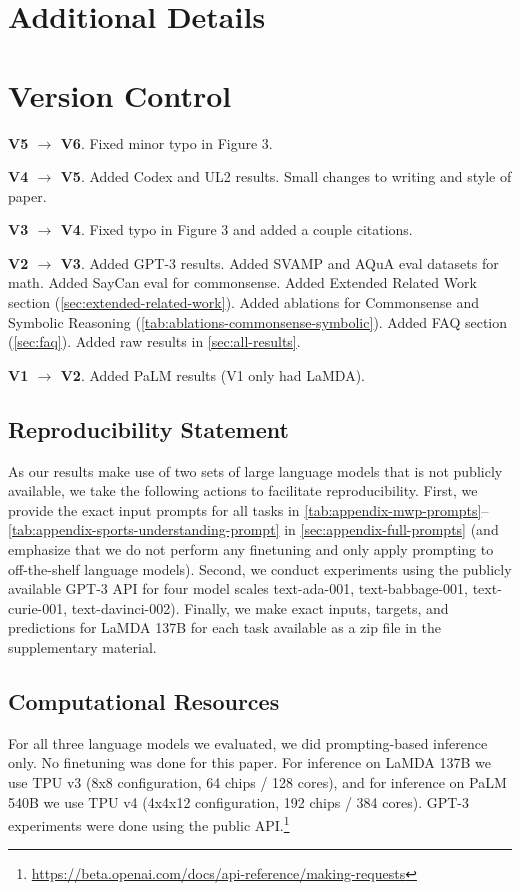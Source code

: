 \documentclass[]{article}
\theoremstyle{plain}
\theoremstyle{definition}
\theoremstyle{remark}
\newcommand{\lamda}[0]{LaMDA}
\newcommand{\palm}[0]{PaLM}
\begin{document}



\clearpage
\section{Additional Details}


\section*{Version Control}
\textbf{V5 $\rightarrow$ V6}. Fixed minor typo in Figure 3.  

\textbf{V4 $\rightarrow$ V5}. Added Codex and UL2 results. Small changes to writing and style of paper.

\textbf{V3 $\rightarrow$ V4}. Fixed typo in Figure 3 and added a couple citations.

\textbf{V2 $\rightarrow$ V3}. Added GPT-3 results. Added SVAMP and AQuA eval datasets for math. Added SayCan eval for commonsense. Added Extended Related Work section (\cref{sec:extended-related-work}). Added ablations for Commonsense and Symbolic Reasoning (\cref{tab:ablations-commonsense-symbolic}). Added FAQ section (\cref{sec:faq}). Added raw results in \cref{sec:all-results}.

\textbf{V1 $\rightarrow$ V2}. Added \palm{} results (V1 only had \lamda{}).

\subsection{Reproducibility Statement}\label{subsec:reproducibility}
As our results make use of two sets of large language models that is not publicly available, we take the following actions to facilitate reproducibility. 
First, we provide the exact input prompts for all tasks in \cref{tab:appendix-mwp-prompts}--\cref{tab:appendix-sports-understanding-prompt} in \cref{sec:appendix-full-prompts} (and emphasize that we do not perform any finetuning and only apply prompting to off-the-shelf language models). 
Second, we conduct experiments using the publicly available GPT-3 API for four model scales text-ada-001, text-babbage-001, text-curie-001, text-davinci-002).
Finally, we make exact inputs, targets, and predictions for \lamda{} 137B for each task available as a zip file in the supplementary material.


\subsection{Computational Resources}\label{subsec:computational-resources}
For all three language models we evaluated, we did prompting-based inference only. No finetuning was done for this paper. For inference on \lamda{} 137B we use TPU v3 (8x8 configuration, 64 chips / 128 cores), and for inference on \palm{} 540B we use TPU v4 (4x4x12 configuration, 192 chips / 384 cores). GPT-3 experiments were done using the public API.\footnote{\url{https://beta.openai.com/docs/api-reference/making-requests}}
\end{document}
